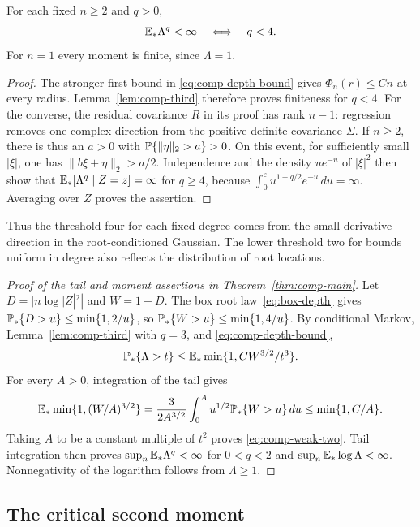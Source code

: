 \begin{proposition}\label{prop:comp-fixed-degree}
For each fixed $n\ge2$ and $q>0$,
\[
  \mathbb E_*\Lambda^q<\infty\quad\Longleftrightarrow\quad q<4.
\]
For $n=1$ every moment is finite, since $\Lambda=1$.
\end{proposition}

\begin{proof}
The stronger first bound in \eqref{eq:comp-depth-bound} gives
$\Phi_n(r)\le Cn$ at every radius.  Lemma~\ref{lem:comp-third} therefore
proves finiteness for $q<4$.  For the converse, the residual covariance
$R$ in its proof has rank $n-1$: regression removes one complex
direction from the positive definite covariance $\Sigma$.  If $n\ge2$,
there is thus an $a>0$ with $\mathbb P\{\|\eta\|_2>a\}>0$.  On this event,
for sufficiently small $|\xi|$, one has $\|b\xi+\eta\|_2>a/2$.
Independence and the density $u e^{-u}$ of $|\xi|^2$ then show that
$\mathbb E_*[\Lambda^q\mid Z=z]=\infty$ for $q\ge4$, because
$\int_0^\varepsilon u^{1-q/2}e^{-u}\,du=\infty$.  Averaging over $Z$
proves the assertion.
\end{proof}

Thus the threshold four for each fixed degree comes from the small
derivative direction in the root-conditioned Gaussian.  The lower
threshold two for bounds uniform in degree also reflects the
distribution of root locations.

\begin{proof}[Proof of the tail and moment assertions in
Theorem~\ref{thm:comp-main}]
Let $D=|n\log|Z|^2|$ and $W=1+D$.  The box root law~\eqref{eq:box-depth} gives
$\mathbb P_*\{D>u\}\le\min\{1,2/u\}$, so
$\mathbb P_*\{W>u\}\le\min\{1,4/u\}$.  By conditional Markov,
Lemma~\ref{lem:comp-third} with $q=3$, and \eqref{eq:comp-depth-bound},
\[
  \mathbb P_*\{\Lambda>t\}
  \le\mathbb E_*\min\{1,CW^{3/2}/t^3\}.
\]
For every $A>0$, integration of the tail gives
\[
  \mathbb E_*\min\{1,(W/A)^{3/2}\}
  =\frac{3}{2A^{3/2}}\int_0^A
       u^{1/2}\mathbb P_*\{W>u\}\,du
  \le\min\{1,C/A\}.
\]
Taking $A$ to be a constant multiple of $t^2$ proves
\eqref{eq:comp-weak-two}.  Tail integration then proves
$\sup_n\mathbb E_*\Lambda^q<\infty$ for $0<q<2$ and
$\sup_n\mathbb E_*\log\Lambda<\infty$.  Nonnegativity of the logarithm
follows from $\Lambda\ge1$.
\end{proof}

\subsection{The critical second moment}

